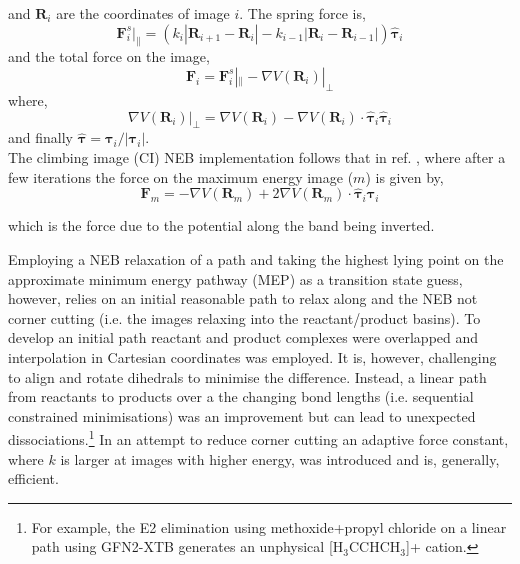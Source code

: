 \documentclass[../../main.tex]{subfiles}
\begin{document}
and $\boldsymbol{R}_i$ are the coordinates of image $i$. The spring force is,
\begin{equation}
	\boldsymbol{F}^s_i|_{\parallel} = (k_i|\boldsymbol{R}_{i+1} - \boldsymbol{R}_i| - k_{i-1}|\boldsymbol{R}_i - \boldsymbol{R}_{i-1}|) \hat{\boldsymbol{\tau}}_i
\end{equation}
and the total force on the image,
\begin{equation}
	\boldsymbol{F}_i = \boldsymbol{F}^s_i|_{\parallel} - \nabla V(\boldsymbol{R}_i)|_\perp
\end{equation}
where,
\begin{equation}
	\nabla V(\boldsymbol{R}_i)|_\perp = \nabla V(\boldsymbol{R}_i) - \nabla V(\boldsymbol{R}_i)\cdot \hat{\boldsymbol{\tau}}_i\hat{\boldsymbol{\tau}}_i
\end{equation}
and finally $\hat{\boldsymbol{\tau}} = \boldsymbol{\tau}_i/|\boldsymbol{\tau}_i|$.
\\
The climbing image (CI) NEB implementation follows that in ref. \cite{Henkelman2000CINEB}, where after a few iterations the force on the maximum energy image ($m$) is given by,
\begin{equation}
	\boldsymbol{F}_{m} = -\nabla V(\boldsymbol{R}_m) + 2\nabla V(\boldsymbol{R}_m)\cdot \hat{\boldsymbol{\tau}}_i\hat{\boldsymbol{\tau}}_i
\end{equation}

which is the force due to the potential along the band being inverted.


Employing a NEB relaxation of a path and taking the highest lying point on the approximate minimum energy pathway (MEP) as a transition state guess, however, relies on an initial reasonable path to relax along and the NEB not corner cutting (i.e. the images relaxing into the reactant/product basins). To develop an initial path reactant and product complexes were overlapped and interpolation in Cartesian coordinates was employed. It is, however, challenging to align and rotate dihedrals to minimise the difference. Instead, a linear path from reactants to products over a the changing bond lengths (i.e. sequential constrained minimisations) was an improvement but can lead to unexpected dissociations.\footnote{For example, the E2 elimination using methoxide+propyl chloride on a linear path using GFN2-XTB generates an unphysical [H$_3$CCHCH$_3$]+ cation.} In an attempt to reduce corner cutting an adaptive force constant, where $k$ is larger at images with higher energy, was introduced and is, generally, efficient.\cite{Henkelman2000NEB}
\end{document}
